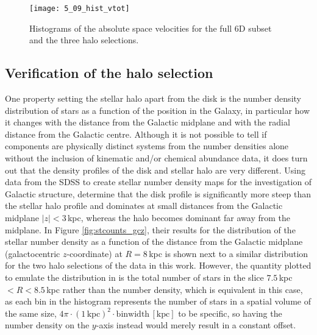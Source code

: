 \documentclass[a4paper,11pt]{article}
\begin{document}
%
\begin{figure}[ht]
 \centering
 \texttt{[image: 5\_09\_hist\_vtot]}
 \caption[Space velocities of 6D subset and halo selections]{Histograms of the absolute space velocities for the full 6D subset and the three halo selections.}
 \label{fig:hist_vtot}
\end{figure}
%
\subsection{Verification of the halo selection}\label{halo_selec}
One property setting the stellar halo apart from the disk is the number density distribution of stars as a function of the position in the Galaxy, in particular how it changes with the distance from the Galactic midplane and with the radial distance from the Galactic centre. Although it is not possible to tell if components are physically distinct systems from the number densities alone without the inclusion of kinematic and/or chemical abundance data, it does turn out that the density profiles of the disk and stellar halo are very different. Using data from the SDSS to create stellar number density maps for the investigation of Galactic structure, \citet{juric08} determine that the disk profile is significantly more steep than the stellar halo profile and dominates at small distances from the Galactic midplane $|z|<3$\,kpc, whereas the halo becomes dominant far away from the midplane. In Figure \ref{fig:stcounts_gcz}, their results for the distribution of the stellar number density as a function of the distance from the Galactic midplane (galactocentric $z$-coordinate) at $R=8$\,kpc is shown next to a similar distribution for the two halo selections of the data in this work. However, the quantity plotted to emulate the distribution in \citet{juric08} is the total number of stars in the slice $7.5$\,kpc $<R<8.5$\,kpc rather than the number density, which is equivalent in this case, as each bin in the histogram represents the number of stars in a spatial volume of the same size, $4\pi\cdot(1\,\mathrm{kpc})^2\cdot\mathrm{binwidth\,[kpc]}$ to be specific, so having the number density on the $y$-axis instead would merely result in a constant offset.
%
\end{document}
